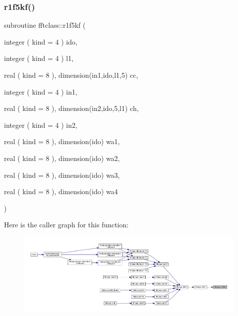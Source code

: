 \subsubsection{\texorpdfstring{r1f5kf()}{r1f5kf()}}
{\footnotesize\ttfamily subroutine fftclass\+::r1f5kf (\begin{DoxyParamCaption}\item[{integer ( kind = 4 )}]{ido,  }\item[{integer ( kind = 4 )}]{l1,  }\item[{real ( kind = 8 ), dimension(in1,ido,l1,5)}]{cc,  }\item[{integer ( kind = 4 )}]{in1,  }\item[{real ( kind = 8 ), dimension(in2,ido,5,l1)}]{ch,  }\item[{integer ( kind = 4 )}]{in2,  }\item[{real ( kind = 8 ), dimension(ido)}]{wa1,  }\item[{real ( kind = 8 ), dimension(ido)}]{wa2,  }\item[{real ( kind = 8 ), dimension(ido)}]{wa3,  }\item[{real ( kind = 8 ), dimension(ido)}]{wa4 }\end{DoxyParamCaption})}

Here is the caller graph for this function\+:\nopagebreak
\begin{figure}[H]
\begin{center}
\leavevmode
\includegraphics[width=350pt]{namespacefftclass_acc419931cfa3ec3e19e6264b35e83aae_icgraph}
\end{center}
\end{figure}
\mbox{\label{namespacefftclass_aa5cb9e2d3b6aa9d5adcb4144cd17f10e}} 
